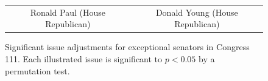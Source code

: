 \begin{figure}
\begin{tabular}{cc}
    Ronald Paul (House Republican) & Donald Young (House Republican) \\
  \end{tabular}
    \caption{Significant issue adjustments for exceptional senators in
  Congress 111.  Each illustrated issue is significant to $p <
  0.05$ by a permutation test.}
  \label{figure:significant_offsets}
\end{figure}





